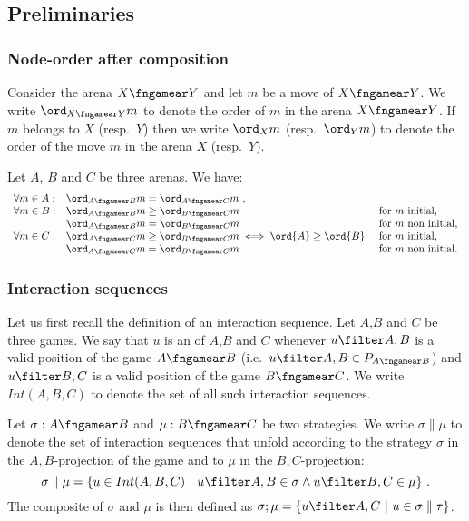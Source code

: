 \subsection{Preliminaries}

\subsubsection{Node-order after composition}

Consider the arena $X\fngamear Y$
and let $m$ be a move of $X\fngamear Y$.
We write $\ord_{X\fngamear Y}{m}$
to denote the order of
$m$ in the arena ${X\fngamear Y}$.
If $m$ belongs to $X$ (resp.~$Y$) then
we write $\ord_X{m}$
(resp.~$\ord_Y{m}$) to denote the order of the move $m$ in the arena $X$ (resp.~$Y$).

\begin{lemma}
\label{lem:compositionorder}
Let $A$, $B$ and $C$ be three arenas. We have:
$$\begin{array}{lll}
\forall m \in A:
    &  \ord_{A\fngamear B}{m} = \ord_{A\fngamear C}{m} \ ,\\
\forall m \in B:
    & \ord_{A\fngamear B}{m} \geq \ord_{B\fngamear C}{m}  & \mbox{for $m$ initial,}\\
    & \ord_{A\fngamear B}{m} = \ord_{B\fngamear C}{m} & \mbox{for $m$ non initial,} \\
\forall m \in C:
    & \ord_{A\fngamear C}{m} \geq \ord_{B\fngamear C}{m} \iff
\ord{A} \geq \ord{B}\ & \mbox{for $m$ initial,}\\
    & \ord_{A\fngamear C}{m} = \ord_{B\fngamear C}{m}   & \mbox{for $m$ non initial.}
\end{array}
$$
\end{lemma}





\subsubsection{Interaction sequences}
Let us first recall the definition of an interaction sequence.
Let $A$,$B$ and $C$ be three games.
We say that $u$  is an  of $A$,$B$ and $C$ whenever $u\filter A,B$ is a valid position of the game $A\fngamear B$
(i.e.~$u\filter A,B \in P_{A\fngamear B}$)
and  $u\filter B,C$ is a valid position of the game
$B\fngamear C$. We write $Int(A,B,C)$ to denote
the set of all such interaction sequences.

Let $\sigma:A\fngamear B$ and $\mu:B\fngamear C$
be two strategies. We write $\sigma \parallel \mu$ to denote the
set of interaction sequences that unfold according to the strategy $\sigma$ in the $A,B$-projection of the game and
to $\mu$ in the $B,C$-projection:
$$ \sigma \parallel \mu = \{ u \in Int(A,B,C) \ | \ u\filter A,B \in \sigma \wedge u \filter B,C \in \mu \} \ .$$
The composite of $\sigma$ and $\mu$ is then defined as $\sigma ; \mu = \{ u \filter A,C \ | \ u \in \sigma \parallel \tau \}$.

